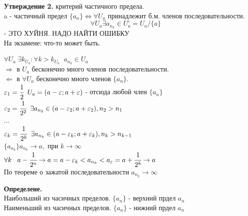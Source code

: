 \documentclass[12pt, paper]{article}
\newcommand{\eps}{\varepsilon}
\begin{document}
\textbf{Утверждение 2.} критерий частичного предела.\\
a - частичный предел $\{a_n\} \Leftrightarrow \forall U_a$ принадлежит б.м. членов последовательности.
\[ \forall U_a \exists a_{n_k}\in U_a^\circ = U_a /\{a\} \] - ЭТО ХУЙНЯ. НАДО НАЙТИ ОШИБКУ\\
На экзамене: что-то может быть.\\

\begin{tcolorbox}[]
    $\forall U_a \; \exists k_{U_a}: \forall k > k_{U_a} \;\; a_{n_k} \in U_a$\\
    $\Rightarrow$ в $U_a$ бесконечно много членов последовательности.\\
    $\Leftarrow$ в $\forall U_a$ бесконечно много членов $\{a_n\}$.\\
    $\eps_1 = \cfrac{1}{2} \;\; U_a = (a-\eps; a+\eps)$ - отсюда любой член $\{a_n\}$\\
    $\eps_2 = \cfrac{1}{2^2} \;\; \exists a_{n_2} \in (a-\eps_2; a+\eps_2), n_2>n_1$\\
    ...\\
    $\eps_k = \cfrac{1}{2^k} \;\; \exists a_{n_k} \in (a-\eps_k; a+\eps_k), n_k>n_{k-1}$\\
    $\{a_{n_k}\} a_{n_k} \to a,$ при $k\to \infty$\\
    $\forall k\;\;\; a-\cfrac{1}{2^n} \to a= a - \eps_k < a_{n_k} < a_\eps = a+ \cfrac{1}{2^k} \to a$\\
    По теореме о зажатой последовательности $a_{n_k} \to \infty$
\end{tcolorbox}

\begin{tcolorbox}
    \textbf{Определене.} \\
    Наибольший из часичных пределов. $\{a_n\}$ - верхний прдел $a_n$\\
    Наименьший из часичных пределов. $\{a_n\}$ - нижний прдел $a_n$
\end{tcolorbox}
\end{document}

